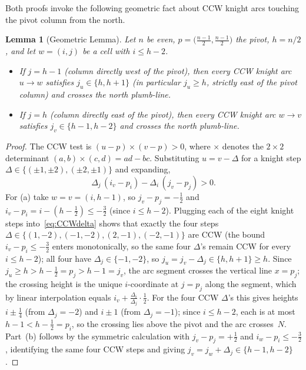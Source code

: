 \documentclass[11pt]{article}
\theoremstyle{plain}
\newtheorem{lemma}{Lemma}
\theoremstyle{remark}
\newcommand{\half}{\tfrac{1}{2}}
\begin{document}
Both proofs invoke the following geometric fact about CCW knight
arcs touching the pivot column from the north.

\begin{lemma}[Geometric Lemma]\label{lem:G}
Let $n$ be even, $p=\bigl(\tfrac{n-1}{2},\tfrac{n-1}{2}\bigr)$ the
pivot, $h=n/2$, and let $w=(i,j)$ be a cell with $i\le h-2$.
\begin{itemize}
\item[(a)] If $j=h-1$ (column directly west of the pivot), then every
CCW knight arc $u\to w$ satisfies $j_u\in\{h,h+1\}$ (in particular
$j_u\ge h$, strictly east of the pivot column) and crosses the north
plumb-line.
\item[(b)] If $j=h$ (column directly east of the pivot), then every
CCW knight arc $w\to v$ satisfies $j_v\in\{h-1,h-2\}$ and crosses the
north plumb-line.
\end{itemize}
\end{lemma}

\begin{proof}
The CCW test is $(u-p)\times(v-p)>0$, where $\times$ denotes the
$2\times 2$ determinant $(a,b)\times(c,d)=ad-bc$.  Substituting
$u=v-\Delta$ for a knight step
$\Delta\in\{(\pm 1,\pm 2),(\pm 2,\pm 1)\}$ and expanding,
\begin{equation}\label{eq:CCWdelta}
  \Delta_j\,(i_v-p_i) - \Delta_i\,(j_v-p_j) > 0.
\end{equation}
For (a) take $w=v=(i,h-1)$, so $j_v-p_j=-\half$ and
$i_v-p_i=i-(h-\half)\le-\tfrac{3}{2}$ (since $i\le h-2$).
Plugging each of the eight knight steps into~\eqref{eq:CCWdelta}
shows that exactly the four steps
$\Delta\in\{(1,-2),(-1,-2),(2,-1),(-2,-1)\}$ are CCW (the bound
$i_v-p_i\le-\tfrac{3}{2}$ enters monotonically, so the same four
$\Delta$'s remain CCW for every $i\le h-2$); all four have
$\Delta_j\in\{-1,-2\}$, so $j_u=j_v-\Delta_j\in\{h,h+1\}\ge h$.
Since $j_u\ge h>h-\half=p_j>h-1=j_v$, the arc segment crosses the
vertical line $x=p_j$;  the crossing height is the unique
$i$-coordinate at $j=p_j$ along the segment, which by linear
interpolation equals $i_v+\frac{\Delta_i}{\Delta_j}\cdot\half$.  For
the four CCW $\Delta$'s this gives heights $i\pm\tfrac14$ (from
$\Delta_j=-2$) and $i\pm 1$ (from $\Delta_j=-1$);  since
$i\le h-2$, each is at most $h-1<h-\half=p_i$, so the crossing
lies above the pivot and the arc crosses~$N$.  Part~(b) follows by the symmetric calculation
with $j_v-p_j=+\half$ and $i_w-p_i\le-\tfrac{3}{2}$, identifying the
same four CCW steps and giving
$j_v=j_w+\Delta_j\in\{h-1,h-2\}$.
\end{proof}
\end{document}
